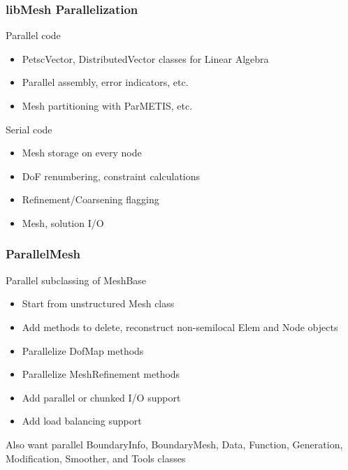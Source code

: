       
\begin{frame}[<+->]
\frametitle{libMesh Parallelization}

  \begin{block}{Parallel code}
  \begin{itemize}
    \item{PetscVector, DistributedVector classes for Linear Algebra}
    \item{Parallel assembly, error indicators, etc.}
    \item{Mesh partitioning with ParMETIS, etc.}
  \end{itemize}
  \end{block}

  \begin{block}{Serial code}
  \begin{itemize}
    \item{Mesh storage on every node}
    \item{DoF renumbering, constraint calculations}
    \item{Refinement/Coarsening flagging}
    \item{Mesh, solution I/O}
  \end{itemize}
  \end{block}
\end{frame}


\begin{frame}
\frametitle{ParallelMesh}

  \begin{block}{Parallel subclassing of MeshBase}
  \begin{itemize}
    \item{Start from unstructured Mesh class}
    \item{Add methods to delete, reconstruct non-semilocal Elem and Node objects}
    \item{Parallelize DofMap methods}
    \item{Parallelize MeshRefinement methods}
    \item{Add parallel or chunked I/O support}
    \item{Add load balancing support}
  \end{itemize}
  \end{block}

Also want parallel BoundaryInfo, BoundaryMesh, Data, Function, Generation,
Modification, Smoother, and Tools classes

\end{frame}
